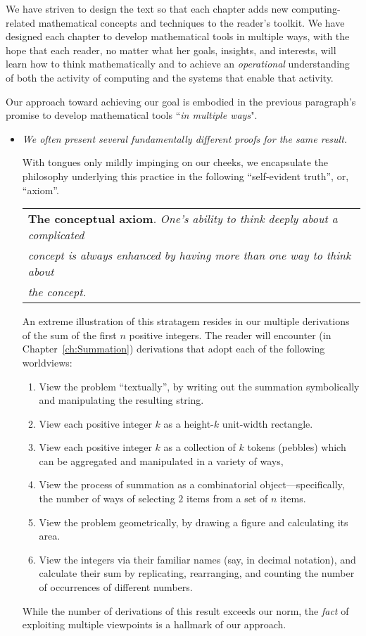 We have striven to design the text so that each chapter adds new computing-related mathematical concepts and techniques to the reader's toolkit.  We have designed each chapter to develop mathematical tools in multiple ways, with the hope that each reader, no matter what her goals, insights, and interests, will learn how to think mathematically and to achieve an {\em operational} understanding of both the activity of computing and the systems that enable that activity.

Our approach toward achieving our goal is embodied in the previous paragraph's promise to develop mathematical tools ``{\em in multiple ways}".
\begin{itemize}
\item
{\em We often present several fundamentally different proofs for the same result.}

\smallskip

With tongues only mildly impinging on our cheeks, we encapsulate the philosophy underlying this practice in the following ``self-evident truth'', or, ``axiom''. 

\medskip

\hspace*{.2in}\begin{tabular}{l}
{\bf The conceptual axiom}.
{\em One's ability to think deeply about a complicated } \\
{\em concept is always enhanced by having more than one way to think about} \\
{\em the concept.}
\end{tabular}

\medskip

An extreme illustration of this stratagem resides in our multiple derivations of the sum of the first $n$ positive integers.  The reader will encounter (in Chapter~\ref{ch:Summation}) derivations that adopt each of the following worldviews:
  \begin{enumerate}
    \item
View the problem ``textually'', by writing out the summation symbolically and manipulating the resulting string.
  \item
View each positive integer $k$ as a height-$k$ unit-width rectangle.
  \item
View each positive integer $k$ as a collection of $k$ tokens (pebbles) which can be aggregated and manipulated in a variety of ways,
  \item
View the process of summation as a combinatorial object---specifically, the number of ways of selecting $2$ items from a set of $n$ items.
  \item
View the problem geometrically, by drawing a figure and calculating its area.
  \item
View the integers via their familiar names (say, in decimal notation), and calculate their sum by replicating, rearranging, and counting the number of occurrences of different numbers.
  \end{enumerate}
While the number of derivations of this result exceeds our norm, the {\em fact} of exploiting multiple viewpoints is a hallmark of our approach.


\end{itemize}
